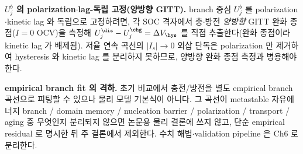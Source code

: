 \textbf{$U_j^b$ 의 polarization$\cdot$lag-독립 고정(양방향 GITT).} branch 중심 $U_j^b$ 를 polarization$\cdot$kinetic
lag 와 독립으로 고정하려면, 각 SOC 격자에서 충$\cdot$방전 \emph{양방향} GITT 완화 종점($I=0$ OCV)을 측정해
$U_j^\dis-U_j^\chg=\Delta V_\hys$ 를 직접 추출한다(완화 종점이라 kinetic lag 가 배제됨). 저율 연속 곡선의
$|I_s|\to0$ 외삽 단독은 polarization 만 제거하여 hysteresis 와 kinetic lag 를 분리하지 못하므로, 양방향 완화 종점
측정과 병용해야 한다.

\begin{boundbox}
\textbf{empirical branch fit 의 격하.} 초기 비교에서 충전/방전을 별도 empirical branch 곡선으로 피팅할 수 있으나
물리 모델 기본식이 아니다. 그 곡선이 metastable 자유에너지 branch / domain memory / nucleation barrier /
polarization / transport / aging 중 무엇인지 분리되지 않으면 논문용 물리 결론에 쓰지 않고, 단순 empirical
residual 로 명시한 뒤 주 결론에서 제외한다. 수치 해법$\cdot$validation pipeline 은 Ch6 로 분리한다.
\end{boundbox}
